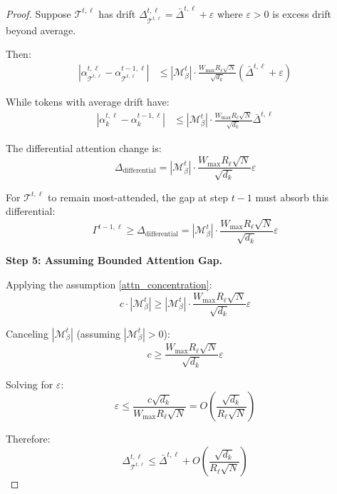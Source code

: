 \documentclass{article} %
\theoremstyle{definition}
\theoremstyle{remark}
\begin{document}
\begin{proof}
Suppose $\mathcal{T}^{t,\ell}$ has drift $\Delta^{t,\ell}_{\mathcal{T}^{t,\ell}} = \bar{\Delta}^{t,\ell} + \varepsilon$ where $\varepsilon > 0$ is excess drift beyond average.

Then:
\begin{align}
|\alpha^{t,\ell}_{\mathcal{T}^{t,\ell}} - \alpha^{t-1,\ell}_{\mathcal{T}^{t,\ell}}| &\leq |\mathcal{M}^t_\beta| \cdot \frac{W_{\max} R_\ell \sqrt{N}}{\sqrt{d_k}} (\bar{\Delta}^{t,\ell} + \varepsilon)
\end{align}

While tokens with average drift have:
\begin{align}
|\alpha^{t,\ell}_k - \alpha^{t-1,\ell}_k| &\leq |\mathcal{M}^t_\beta| \cdot \frac{W_{\max} R_\ell \sqrt{N}}{\sqrt{d_k}} \bar{\Delta}^{t,\ell}
\end{align}

The differential attention change is:
\begin{equation}
\Delta_{\text{differential}} = |\mathcal{M}^t_\beta| \cdot \frac{W_{\max} R_\ell \sqrt{N}}{\sqrt{d_k}} \varepsilon
\end{equation}

For $\mathcal{T}^{t,\ell}$ to remain most-attended, the gap at step $t-1$ must absorb this differential:
\begin{equation}
\Gamma^{t-1,\ell} \geq \Delta_{\text{differential}} = |\mathcal{M}^t_\beta| \cdot \frac{W_{\max} R_\ell \sqrt{N}}{\sqrt{d_k}} \varepsilon
\end{equation}

\textbf{Step 5: Assuming Bounded Attention Gap.}

Applying the assumption \ref{attn_concentration}:
\begin{equation}
c \cdot |\mathcal{M}^t_\beta| \geq |\mathcal{M}^t_\beta| \cdot \frac{W_{\max} R_\ell \sqrt{N}}{\sqrt{d_k}} \varepsilon
\end{equation}

Canceling $|\mathcal{M}^t_\beta|$ (assuming $|\mathcal{M}^t_\beta| > 0$):
\begin{equation}
c \geq \frac{W_{\max} R_\ell \sqrt{N}}{\sqrt{d_k}} \varepsilon
\end{equation}

Solving for $\varepsilon$:
\begin{equation}
\varepsilon \leq \frac{c \sqrt{d_k}}{W_{\max} R_\ell \sqrt{N}} = O\left(\frac{\sqrt{d_k}}{R_\ell \sqrt{N}}\right)
\end{equation}

Therefore:
\begin{equation}
\Delta^{t,\ell}_{\mathcal{T}^{t,\ell}} \leq \bar{\Delta}^{t,\ell} + O\left(\frac{\sqrt{d_k}}{R_\ell \sqrt{N}}\right)
\end{equation}
\end{proof}
\end{document}
